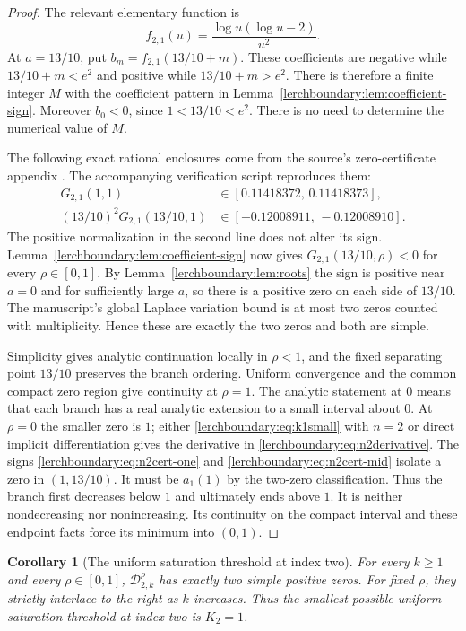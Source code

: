 \documentclass[11pt,a4paper]{article}
\newtheorem{corollary}[theorem]{Corollary}
\theoremstyle{definition}
\theoremstyle{remark}
\numberwithin{equation}{section}
\begin{document}
\begin{proof}
The relevant elementary function is
\[
 f_{2,1}(u)=\frac{\log u(\log u-2)}{u^2}.
\]
At $a=13/10$, put $b_m=f_{2,1}(13/10+m)$.
These coefficients are negative while $13/10+m<e^2$ and positive
while $13/10+m>e^2$.  There is therefore a finite integer $M$ with
the coefficient pattern in Lemma~\ref{lerchboundary:lem:coefficient-sign}.
Moreover $b_0<0$, since $1<13/10<e^2$.  There is no need to determine
the numerical value of $M$.

The following exact rational enclosures come from the source's
zero-certificate appendix \cite{ProveItSnapshot}. The accompanying
verification script reproduces them:
\begin{align}
 G_{2,1}(1,1)&\in[0.11418372,\,0.11418373],
 \label{lerchboundary:eq:n2cert-one}\\
 (13/10)^2G_{2,1}(13/10,1)
 &\in[-0.12008911,\,-0.12008910].
 \label{lerchboundary:eq:n2cert-mid}
\end{align}
The positive normalization in the second line does not alter its sign.
Lemma~\ref{lerchboundary:lem:coefficient-sign} now gives
$G_{2,1}(13/10,\rho)<0$ for every $\rho\in[0,1]$.
By Lemma~\ref{lerchboundary:lem:roots} the sign is positive near
$a=0$ and for sufficiently large $a$, so there is a positive zero
on each side of $13/10$. The manuscript's global Laplace variation
bound is at most two zeros counted with multiplicity. Hence these
are exactly the two zeros and both are simple.

Simplicity gives analytic continuation locally in $\rho<1$, and the
fixed separating point $13/10$ preserves the branch ordering.
Uniform convergence and the common compact zero region give continuity
at $\rho=1$. The analytic statement at $0$ means that each branch has
a real analytic extension to a small interval about $0$.
At $\rho=0$ the smaller zero is $1$; either
\eqref{lerchboundary:eq:k1small} with $n=2$ or direct implicit
differentiation gives the derivative in \eqref{lerchboundary:eq:n2derivative}.
The signs \eqref{lerchboundary:eq:n2cert-one} and
\eqref{lerchboundary:eq:n2cert-mid} isolate a zero in $(1,13/10)$.
It must be $a_1(1)$ by the two-zero classification. Thus the branch
first decreases below $1$ and ultimately ends above $1$.  It is neither
nondecreasing nor nonincreasing. Its continuity on the compact interval
and these endpoint facts force its minimum into $(0,1)$.
\end{proof}

\begin{corollary}[The uniform saturation threshold at index two]
\label{lerchboundary:cor:n2allk}
For every $k\geq1$ and every $\rho\in[0,1]$,
$\mathcal D_{2,k}^{\rho}$ has exactly two simple positive zeros.
For fixed $\rho$, they strictly interlace to the right as $k$ increases.
Thus the smallest possible uniform saturation threshold at index two
is $K_2=1$.
\end{corollary}
\end{document}
